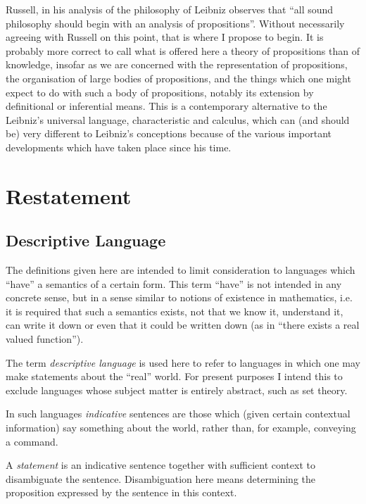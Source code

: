 Russell, in his analysis of the philosophy of Leibniz observes that ``all sound philosophy should begin with an analysis of propositions''.
Without necessarily agreeing with Russell on this point, that is where I propose to begin.
It is probably more correct to call what is offered here a theory of propositions than of knowledge,
insofar as we are concerned with the representation of propositions, the organisation of large bodies of
propositions, and the things which one might expect to do with such a body of propositions, notably
its extension by definitional or inferential means.
This is a contemporary alternative to the Leibniz's universal language, characteristic and calculus,
which can (and should be) very different to Leibniz's conceptions because of the various important
developments which have taken place since his time.


\chapter{Restatement}\label{Restatement}

\section{Descriptive Language}

The definitions given here are intended to limit consideration to languages which ``have'' a semantics of a certain form.
This term ``have'' is not intended in any concrete sense, but in a sense similar to notions of existence in mathematics, i.e. it is required that such a semantics exists, not that we know it, understand it, can write it down or even that it could be written down (as in ``there exists a real valued function'').

The term {\it descriptive language} is used here to refer to languages in which one may make statements about the ``real'' world.
For present purposes I intend this to exclude languages whose subject matter is entirely abstract, such as set theory.

In such languages {\it indicative} sentences are those which (given certain contextual information) say something about the world, rather than, for example, conveying a command.

A {\it statement} is an indicative sentence together with sufficient context to disambiguate the sentence.
Disambiguation here means determining the proposition expressed by the sentence in this context.

